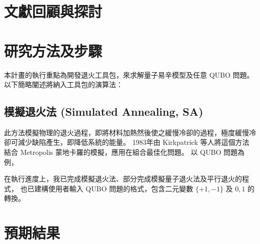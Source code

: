 \documentclass[12pt]{article}
\begin{document}
\section{文獻回顧與探討}





\section{研究方法及步驟}
本計畫的執行重點為開發退火工具包，來求解量子易辛模型及任意 QUBO 問題。
以下簡略闡述將納入工具包的演算法：
\subsection*{模擬退火法 (Simulated Annealing, SA)}
此方法模擬物理的退火過程，即將材料加熱然後使之緩慢冷卻的過程，極度緩慢冷卻可減少缺陷產生，即降低系統的能量。
1983年由 Kirkpatrick 等人將這個方法結合 Metropolis 蒙地卡羅的模擬，應用在組合最佳化問題。
以 QUBO 問題為例， 



在執行進度上，我已完成模擬退火法、部分完成模擬量子退火法及平行退火的程式，
也已建構使用者輸入 QUBO 問題的格式，包含二元變數 $\{+1, -1\}$ 及 ${0 , 1}$ 的轉換。 

\section{預期結果}
\end{document}
